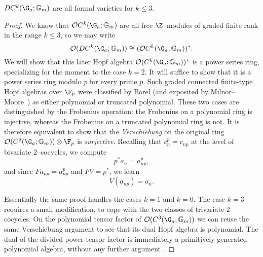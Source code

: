\begin{lemma}\label{CkGaGmAreFVars}
$DC^k(\G_a; \Gm)$ are all formal varieties for $k \le 3$.
\end{lemma}
\begin{proof}
We know that $\sheaf O C^k(\G_a; \Gm)$ are all free $\Z$--modules of graded finite rank in the range $k \le 3$, so we may write \[\sheaf O(D C^k(\G_a; \Gm)) \cong (\sheaf O C^k(\G_a; \Gm))^*.\]  We will show that this later Hopf algebra $\sheaf O(C^k(\G_a; \Gm))^*$ is a power series ring, specializing for the moment to the case $k = 2$.  It will suffice to show that it is a power series ring modulo $p$ for every prime $p$.  Such graded connected finite-type Hopf algebras over $\F_p$ were classified by Borel (and exposited by Milnor--Moore~\cite[Theorem 7.11]{MilnorMoore}) as either polynomial or truncated polynomial.  These two cases are distinguished by the Frobenius operation: the Frobenius on a polynomial ring is injective, whereas the Frobenius on a truncated polynomial ring is not.  It is therefore equivalent to show that the \emph{Verschiebung} on the original ring $\sheaf O(C^2(\G_a; \Gm)) \otimes \F_p$ is \emph{surjective}.  Recalling that $c_n^p = c_{np}$ at the level of bivariate $2$--cocycles, we compute \[p^* a_n = a_{np}^p,\] and since $F a_{np} = a_{np}^p$ and $FV = p^*$, we learn \[V(a_{np}) = a_n.\] 

Essentially the same proof handles the cases $k = 1$ and $k = 0$.  The case $k = 3$ requires a small modification, to cope with the two classes of trivariate $2$--cocycles.  On the polynomial tensor factor of $\sheaf O(C^3(\G_a; \Gm))$ we can reuse the same Verschiebung argument to see that its dual Hopf algebra is polynomial.  The dual of the divided power tensor factor is immediately a primitively generated polynomial algebra, without any further argument .
\end{proof}

